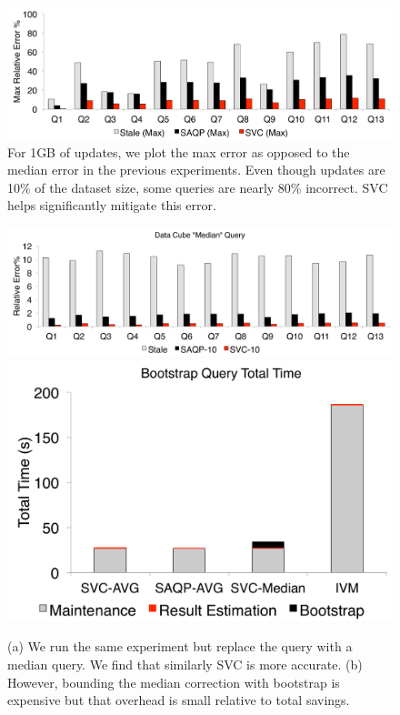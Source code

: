 \begin{figure}[t]
\centering
\includegraphics[scale=0.16]{exp/msdc_4.pdf}
   \caption{For 1GB of updates, we plot the max error as opposed to the median error in the previous experiments. Even though updates are 10\% of the dataset size, some queries are nearly 80\% incorrect. SVC helps significantly mitigate this error. \label{exp2-max}}
\end{figure}

\begin{figure}[t]
\centering
  \includegraphics[scale=0.16]{exp/msdc_5.pdf}
  \includegraphics[scale=0.16]{exp/msdc_6.pdf}
 \caption{(a) We run the same experiment but replace the \sumfunc query with a median query. We find that similarly SVC is more accurate. (b) However, bounding the median correction with bootstrap is expensive but that overhead is small relative to total savings. \label{exp2-median}}
\end{figure}

